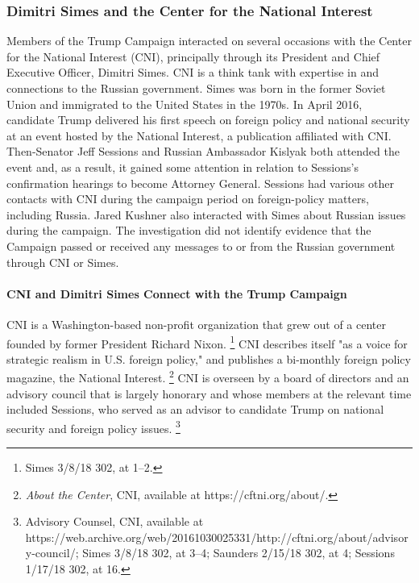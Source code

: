 \subsubsection{Dimitri Simes and the Center for the National Interest}

Members of the Trump Campaign interacted on several occasions with the Center for the National Interest (CNI), principally through its President and Chief Executive Officer, Dimitri Simes.
CNI is a think tank with expertise in and connections to the Russian government.
Simes was born in the former Soviet Union and immigrated to the United States in the 1970s.
In April 2016, candidate Trump delivered his first speech on foreign policy and national security at an event hosted by the National Interest, a publication affiliated with CNI\null.
Then-Senator Jeff Sessions and Russian Ambassador Kislyak both attended the event and, as a result, it gained some attention in relation to Sessions's confirmation hearings to become Attorney General.
Sessions had various other contacts with CNI during the campaign period on foreign-policy matters, including Russia.
Jared Kushner also interacted with Simes about Russian issues during the campaign.
The investigation did not identify evidence that the Campaign passed or received any messages to or from the Russian government through CNI or Simes.

\paragraph{CNI and Dimitri Simes Connect with the Trump Campaign}

CNI is a Washington-based non-profit organization that grew out of a center founded by former President Richard Nixon.%
\footnote{Simes 3/8/18 302, at 1--2.}
CNI describes itself "as a voice for strategic realism in U.S. foreign policy," and publishes a bi-monthly foreign policy magazine, the National Interest.%
\footnote{\textit{About the Center}, CNI, available at https://cftni.org/about/.}
CNI is overseen by a board of directors and an advisory council that is largely honorary and whose members at the relevant time included Sessions, who served as an advisor to candidate Trump on national security and foreign policy issues.%
\footnote{Advisory Counsel, CNI, available at
https://web.archive.org/web/20161030025331/http://cftni.org/about/advisory-council/;
Simes 3/8/18 302, at 3--4;
Saunders 2/15/18 302, at 4;
Sessions 1/17/18 302, at 16.}

